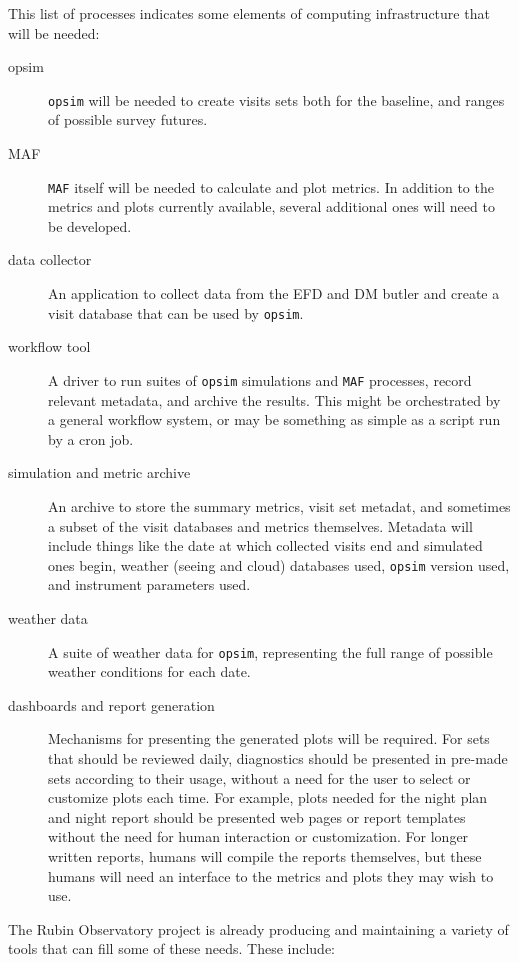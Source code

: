 This list of processes indicates some elements of computing infrastructure that will be needed:
\begin{description}
\item[{opsim}] \texttt{opsim} will be needed to create visits sets both for the baseline, and ranges of possible survey futures.
\item[{MAF}] \texttt{MAF} itself will be needed to calculate and plot metrics. In addition to the metrics and plots currently available, several additional ones will need to be developed.
\item[{data collector}] An application to collect data from the EFD and DM butler and create a visit database that can be used by \texttt{opsim}.
\item[{workflow tool}] A driver to run suites of \texttt{opsim} simulations and \texttt{MAF} processes, record relevant metadata, and archive the results. This might be orchestrated by a general workflow system, or may be something as simple as a script run by a cron job.
\item[{simulation and metric archive}] An archive to store the summary metrics, visit set metadat, and sometimes a subset of the visit databases and metrics themselves. Metadata will include things like the date at which collected visits end and simulated ones begin, weather (seeing and cloud) databases used, \texttt{opsim} version used, and instrument parameters used.
\item[{weather data}] A suite of weather data for \texttt{opsim}, representing the full range of possible weather conditions for each date.
\item[{dashboards and report generation}] Mechanisms for presenting the generated plots will be required. For sets that should be reviewed daily, diagnostics  should be presented in pre-made sets according to their usage, without a need for the user to select or customize plots each time. For example, plots needed for the night plan and night report should be presented web pages or report templates without the need for human interaction or customization. For longer written reports, humans will compile the reports themselves, but these humans will need an interface to the metrics and plots they may wish to use.
\end{description}

The Rubin Observatory project is already producing and maintaining a variety of tools that can fill some of these needs. These include:

